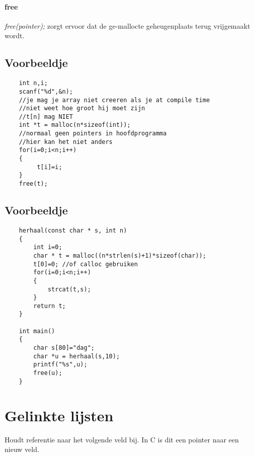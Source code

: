 \documentclass{article}
\begin{document}
\paragraph{free}
\textit{free(pointer); } zorgt ervoor dat de ge-mallocte geheugenplaats terug vrijgemaakt wordt.
\subsection{Voorbeeldje}
\begin{lstlisting}
    int n,i;
    scanf("%d",&n);
    //je mag je array niet creeren als je at compile time
    //niet weet hoe groot hij moet zijn
    //t[n] mag NIET
    int *t = malloc(n*sizeof(int));    
    //normaal geen pointers in hoofdprogramma
    //hier kan het niet anders
    for(i=0;i<n;i++)
    {
         t[i]=i;
    }
    free(t);
\end{lstlisting}
\subsection{Voorbeeldje}
\begin{lstlisting}
    herhaal(const char * s, int n)
    {
        int i=0;
        char * t = malloc((n*strlen(s)+1)*sizeof(char));
        t[0]=0; //of calloc gebruiken
        for(i=0;i<n;i++)
        {
            strcat(t,s);
        }
        return t;
    }

    int main()
    {
        char s[80]="dag";
        char *u = herhaal(s,10);
        printf("%s",u);
        free(u);
    }
\end{lstlisting}
\section{Gelinkte lijsten}
Houdt referentie naar het volgende veld bij. In C is dit een pointer naar een nieuw veld.
\end{document}
